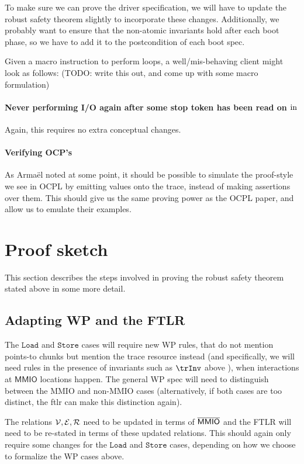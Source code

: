 \documentclass{article}
\newcommand{\I}[1]{\ensuremath{\mathtt{#1}}}
\newcommand{\Sf}[1]{\ensuremath{\mathsf{#1}}}
\newcommand{\MMIO}{\Sf{MMIO}\xspace}
\begin{document}
To make sure we can prove the driver specification, we will have to update the
robust safety theorem slightly to incorporate these changes. Additionally, we probably want to ensure that the non-atomic invariants hold after each boot phase, so we have to add it to the postcondition of each boot spec.

Given a macro instruction to perform loops, a well/mis-behaving client might
look as follows: (TODO: write this out,
and come up with some macro formulation)

\paragraph{Never performing I/O again after some stop token has been read on $\mathrm{in}$}
Again, this requires no extra conceptual changes.

\paragraph{Verifying OCP's}
As Arma\"el noted at some point, it should be possible to simulate the
proof-style we see in OCPL by emitting values onto the trace, instead of making
assertions over them. This should give us the same proving power as the OCPL
paper, and allow us to emulate their examples.

\section{Proof sketch}
This section describes the steps involved in proving the robust safety theorem
stated above in some more detail.

\subsection{Adapting WP and the FTLR}
The $\I{Load}$ and $\I{Store}$ cases will require new WP rules, that do not mention
points-to chunks but mention the trace resource instead (and specifically, we
will need rules in the presence of invariants such as $\trInv$ above ), when interactions at
\MMIO locations happen. The general WP spec will need to distinguish between
the MMIO and non-MMIO cases (alternatively, if both cases are too distinct, the
ftlr can make this distinction again).

The relations $\mathcal{V},\mathcal{E},\mathcal{R}$ need to be updated in terms of $\notMMIO$ and the FTLR will need to be re-stated in terms of these updated relations. This should again only
require some changes for the $\I{Load}$ and $\I{Store}$ cases, depending on how
we choose to formalize the WP cases above.
\end{document}
